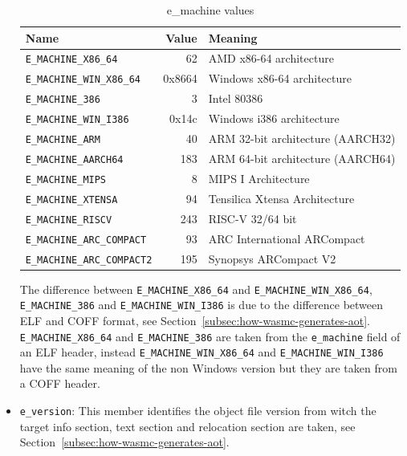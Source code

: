 \documentclass{article}
\begin{document}
\begin{itemize}
        \begin{table}[H]
        \centering
        \begin{tabular}{lrl}
            \hline
            Name & Value & Meaning \\
            \hline
            \verb|E_MACHINE_X86_64|       &     62 & AMD x86-64 architecture \\
            \verb|E_MACHINE_WIN_X86_64|   & 0x8664 & Windows x86-64 architecture \\
            \verb|E_MACHINE_386|          &      3 & Intel 80386 \\
            \verb|E_MACHINE_WIN_I386|     &  0x14c & Windows i386 architecture \\
            \verb|E_MACHINE_ARM|          &     40 & ARM 32-bit architecture (AARCH32) \\
            \verb|E_MACHINE_AARCH64|      &    183 & ARM 64-bit architecture (AARCH64) \\
            \verb|E_MACHINE_MIPS|         &      8 & MIPS I Architecture \\
            \verb|E_MACHINE_XTENSA|       &     94 & Tensilica Xtensa Architecture \\
            \verb|E_MACHINE_RISCV|        &    243 & RISC-V 32/64 bit \\
            \verb|E_MACHINE_ARC_COMPACT|  &     93 & ARC International ARCompact \\
            \verb|E_MACHINE_ARC_COMPACT2| &    195 & Synopsys ARCompact V2 \\
            \hline
        \end{tabular}
        \caption{e\_machine values}
        \label{table:e-machine-legal-values}
        \end{table}

        The difference between \verb|E_MACHINE_X86_64| and \verb|E_MACHINE_WIN_X86_64|, \verb|E_MACHINE_386| and \verb|E_MACHINE_WIN_I386| is due to the difference between ELF and COFF format, see Section~\ref{subsec:how-wasmc-generates-aot}.
        \verb|E_MACHINE_X86_64| and \verb|E_MACHINE_386| are taken from the \verb|e_machine| field of  an ELF header, instead \verb|E_MACHINE_WIN_X86_64| and \verb|E_MACHINE_WIN_I386| have the same meaning of the non Windows version but they are taken from a COFF header.

    \item \verb|e_version|:
        This member identifies the object file version from witch the target info section, text section and relocation section are taken, see Section~\ref{subsec:how-wasmc-generates-aot}.


\end{itemize}
\end{document}
